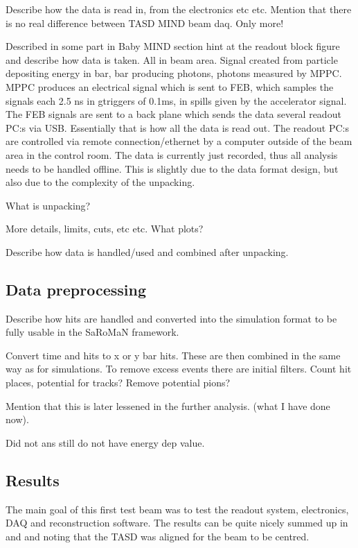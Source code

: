 Describe how the data is read in, from the electronics etc etc. Mention that there is no real difference between TASD MIND beam daq. Only more! 

Described in some part in Baby MIND section hint at the readout block figure and describe how data is taken.  All in beam area. Signal created from particle depositing energy in bar, bar producing photons, photons measured by MPPC. MPPC produces an electrical signal which is sent to FEB, which samples the signals each 2.5 ns in gtriggers of 0.1ms, in spills given by the accelerator signal.
The FEB signals are sent to a back plane which sends the data several readout PC:s via USB.
Essentially that is how all the data is read out. The readout PC:s are controlled via remote connection/ethernet by a computer outside of the beam area in the control room.
The data is currently just recorded, thus all analysis needs to be handled offline. This is slightly due to the data format design, but also due to the complexity of the unpacking.

What is unpacking?

More details, limits, cuts, etc etc. What plots?

Describe how data is handled/used and combined after unpacking.

\subsection{Data preprocessing}
Describe how hits are handled and converted into the simulation format to be fully usable in the SaRoMaN framework.

Convert time and hits to x or y bar hits. These are then combined in the same way as for simulations. To remove excess events there are initial filters. Count hit places, potential for tracks? Remove potential pions? 

Mention that this is later lessened in the further analysis. (what I have done now).

Did not ans still do not have energy dep value.

\subsection{Results}

The main goal of this first test beam was to test the readout system, electronics, DAQ and reconstruction software. The results can be quite nicely summed up in  and  and noting that the TASD was aligned for the beam to be centred. 

